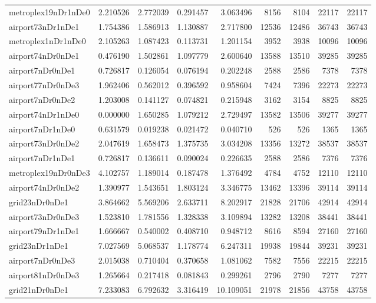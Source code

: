 \begin{longtable}{|l|r|r|r|r|r|r|r|r|}
metroplex19nDr1nDe0 & 2.210526 & 2.772039 & 0.291457 & 3.063496 & 8156 & 8104 & 22117 & 22117 \\
airport73nDr1nDe1 & 1.754386 & 1.586913 & 1.130887 & 2.717800 & 12536 & 12486 & 36743 & 36743 \\
metroplex1nDr1nDe0 & 2.105263 & 1.087423 & 0.113731 & 1.201154 & 3952 & 3938 & 10096 & 10096 \\
airport74nDr0nDe1 & 0.476190 & 1.502861 & 1.097779 & 2.600640 & 13588 & 13510 & 39285 & 39285 \\
airport7nDr0nDe1 & 0.726817 & 0.126054 & 0.076194 & 0.202248 & 2588 & 2586 & 7378 & 7378 \\
airport77nDr0nDe3 & 1.962406 & 0.562012 & 0.396592 & 0.958604 & 7424 & 7396 & 22273 & 22273 \\
airport7nDr0nDe2 & 1.203008 & 0.141127 & 0.074821 & 0.215948 & 3162 & 3154 & 8825 & 8825 \\
airport74nDr1nDe0 & 0.000000 & 1.650285 & 1.079212 & 2.729497 & 13582 & 13506 & 39277 & 39277 \\
airport7nDr1nDe0 & 0.631579 & 0.019238 & 0.021472 & 0.040710 & 526 & 526 & 1365 & 1365 \\
airport73nDr0nDe2 & 2.047619 & 1.658473 & 1.375735 & 3.034208 & 13356 & 13272 & 38537 & 38537 \\
airport7nDr1nDe1 & 0.726817 & 0.136611 & 0.090024 & 0.226635 & 2588 & 2586 & 7376 & 7376 \\
metroplex19nDr0nDe3 & 4.102757 & 1.189014 & 0.187478 & 1.376492 & 4784 & 4752 & 12110 & 12110 \\
airport74nDr0nDe2 & 1.390977 & 1.543651 & 1.803124 & 3.346775 & 13462 & 13396 & 39114 & 39114 \\
grid23nDr0nDe1 & 3.864662 & 5.569206 & 2.633711 & 8.202917 & 21828 & 21706 & 42914 & 42914 \\
airport73nDr0nDe3 & 1.523810 & 1.781556 & 1.328338 & 3.109894 & 13282 & 13208 & 38441 & 38441 \\
airport79nDr1nDe1 & 1.666667 & 0.540002 & 0.408710 & 0.948712 & 8616 & 8594 & 27160 & 27160 \\
grid23nDr1nDe1 & 7.027569 & 5.068537 & 1.178774 & 6.247311 & 19938 & 19844 & 39231 & 39231 \\
airport7nDr0nDe3 & 2.015038 & 0.710404 & 0.370658 & 1.081062 & 7582 & 7556 & 22215 & 22215 \\
airport81nDr0nDe3 & 1.265664 & 0.217418 & 0.081843 & 0.299261 & 2796 & 2790 & 7277 & 7277 \\
grid21nDr0nDe1 & 7.233083 & 6.792632 & 3.316419 & 10.109051 & 21978 & 21856 & 43758 & 43758 \\

\end{longtable}
